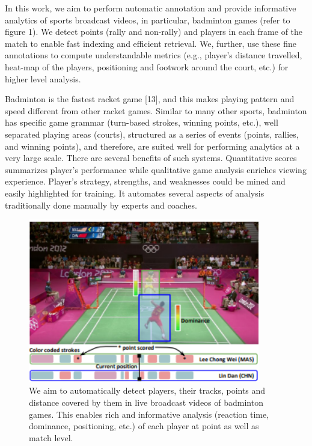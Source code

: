 \documentclass[runningheads,a4paper]{llncs}
\begin{document}
In  this  work,  we  aim  to  perform  automatic  annotation and provide informative analytics of sports broadcast videos, in particular, badminton games (refer to figure 1). We detect points (rally and non-rally) and players in each frame of the match to enable fast indexing and efficient retrieval. We, further, use these fine annotations to compute understandable metrics  (e.g.,  player’s  distance travelled,  heat-map of the players,  positioning and footwork around the court, etc.) for higher level analysis. \par
Badminton is the fastest racket game [13], and this makes playing pattern and speed different from other racket games. Similar to many other sports, badminton has specific game grammar (turn-based strokes, winning points, etc.), well separated playing areas (courts), structured as a series of events (points, rallies, and winning points), and therefore, are suited well for performing analytics at a very large scale. There are several benefits of such systems. Quantitative scores summarizes player's performance while qualitative game analysis enriches viewing experience. Player's strategy, strengths, and weaknesses could be mined and easily highlighted for training. It automates several aspects of analysis traditionally done manually by experts and coaches. \par 
\begin{figure}[h]
\centering
\includegraphics[width=0.9\textwidth]{Images/intro.png}
\caption{\label{fig:intro}We aim to automatically detect players, their tracks, points and distance covered by them in live broadcast videos of badminton games. This enables rich and informative analysis (reaction time, dominance, positioning, etc.) of each player at point as well as match level.}
\end{figure}
\end{document}

